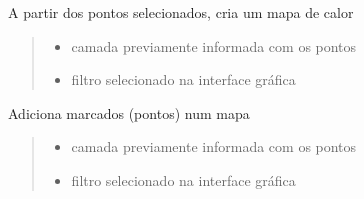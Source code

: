 \documentclass[letterpaper,10pt,brazil]{sphinxmanual}
\begin{document}

\begin{fulllineitems}
\label{\detokenize{pdcvis:app.addMapHeat}}
\pysigstartsignatures
{}
\pysigstopsignatures
\sphinxAtStartPar
A partir dos pontos selecionados, cria um mapa de calor
\begin{quote}\begin{description}
\begin{itemize}
\item {} 
\sphinxAtStartPar
{} \textendash{} camada previamente informada com os pontos

\item {} 
\sphinxAtStartPar
{} \textendash{} filtro selecionado na interface gráfica

\end{itemize}

\end{description}\end{quote}

\end{fulllineitems}


\begin{fulllineitems}
\label{\detokenize{pdcvis:app.addMapMarcador}}
\pysigstartsignatures
{}
\pysigstopsignatures
\sphinxAtStartPar
Adiciona marcados (pontos) num mapa
\begin{quote}\begin{description}
\begin{itemize}
\item {} 
\sphinxAtStartPar
{} \textendash{} camada previamente informada com os pontos

\item {} 
\sphinxAtStartPar
{} \textendash{} filtro selecionado na interface gráfica

\end{itemize}

\end{description}\end{quote}

\end{fulllineitems}
\end{document}
